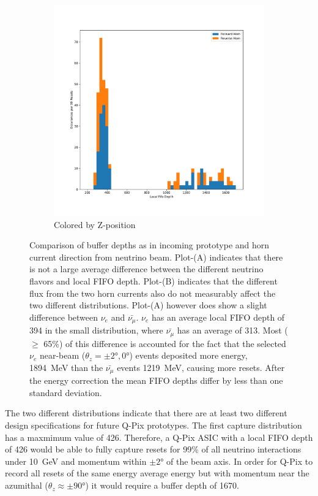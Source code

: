 \begin{figure}
\begin{subfigure}{.5\textwidth}
  \includegraphics[width=\textwidth]{images/df_horn_cut.pdf}
  \caption{Colored by Z-position}
\end{subfigure}
\caption{Comparison of buffer depths as in incoming prototype and horn current direction from neutrino beam.
Plot-(A) indicates that there is not a large average difference between the different neutrino flavors and local FIFO depth.
Plot-(B) indicates that the different flux from the two horn currents also do not measurably affect the two different distributions.
Plot-(A) however does show a slight difference between $\nu_{e}$ and $\bar{\nu_{\mu}}$.
$\nu_{e}$ has an average local FIFO depth of 394 in the small distribution, where $\bar{\nu_{\mu}}$ has an average of 313.
Most ($\geq $ 65\%) of this difference is accounted for the fact that the selected $\nu_{e}$ near-beam ($\theta_{z} = \pm 2\unit{\degree}, 0\unit{\degree}$) events deposited more energy, 1894~\unit{MeV} than the $\bar{\nu_{\mu}}$ events 1219~\unit{MeV}, causing more resets.
After the energy correction the mean FIFO depths differ by less than one standard deviation.
}
\label{fig:compare_integral_pdg}
\end{figure}

The two different distributions indicate that there are at least two different design specifications for future Q-Pix prototypes.
The first capture distribution has a maxmimum value of 426.
Therefore, a Q-Pix ASIC with a local FIFO depth of 426 would be able to fully capture resets for 99\% of all neutrino interactions under 10~\unit{GeV} and momentum within $\pm 2\unit{\degree}$ of the beam axis.
In order for Q-Pix to record all resets of the same energy average energy but with momentum near the azumithal ($\theta_{z} \approx \pm 90$\unit{\degree}) it would require a buffer depth of 1670.

